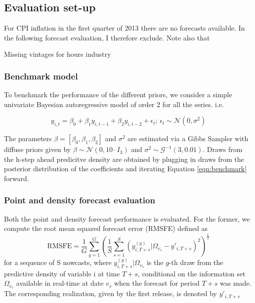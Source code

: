\documentclass[notitlepage,a4paper,12pt]{article}
\begin{document}
\subsection{Evaluation set-up}

For CPI inflation in the first quarter of 2013 there are no forecasts available. In the following forecast evaluation, I therefore exclude. Note also that 

Missing vintages for hours industry

\subsubsection{Benchmark model}

To benchmark the performance of the different priors, we consider a simple univariate Bayesian autoregressive model of order 2 for all the series.  i.e. 

\begin{equation}\label{eqn:benchmark}
y_{i,t} = \beta_0 + \beta_1 y_{i,t-1} + \beta_2 y_{i,t-2} + \epsilon_t; \, \epsilon_t \sim \mathcal{N}(0, \sigma^2)
\end{equation}

The parameters $\beta = [\beta_0, \beta_1, \beta_2]$  and $\sigma^2$ are estimated via a Gibbs Sampler with diffuse priors given by $\beta \sim \mathcal{N}(0,10 \cdot I_3)$  and $\sigma^2 \sim \mathcal{G}^{-1}(3,0.01)$. Draws from the h-step ahead predicitve density are obtained by plugging in draws from the posterior distribution of the coefficients and iterating Equation \ref{eqn:benchmark} forward. 

\subsubsection{Point and density forecast evaluation}

Both the point and density forecast performance is evaluated. For the former, we compute the root mean squared forecast error (RMSFE) defined as
\begin{equation*}
\text{RMSFE} = \frac{1}{G} \sum_{g=1}^G\left( \frac{1}{S} \sum_{s=1}^S ({y}^{(g)}_{i, T+s}|\Omega_{v_{s}} - y'_{i, T+s})^2 \right)^{\frac{1}{2}}
\end{equation*}
for a sequence of S nowcasts, where ${y}^{(g)}_{i, T+s}|\Omega_{v_{s}}$ is the $g$-th draw from the predictive density of variable i at time $T+s$, conditional on the information set $\Omega_{v_s}$ available in real-time at date $v_s$ when the forecast for period $T+s$ was made. The corresponding realization, given by the first release, is denoted by $y'_{i,T+s}$ 
\end{document}
